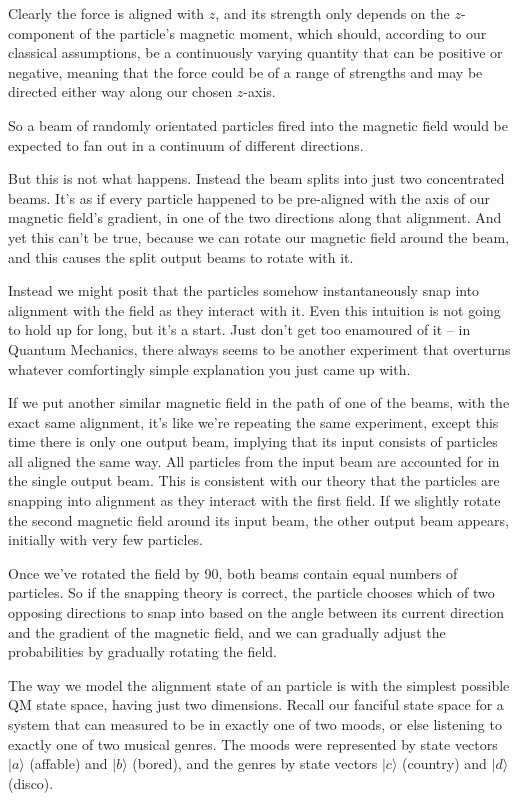 Clearly the force is aligned with $z$, and its strength only depends on the $z$-component of the particle's magnetic moment, which should, according to our classical assumptions, be a continuously varying quantity that can be positive or negative, meaning that the force could be of a range of strengths and may be directed either way along our chosen $z$-axis.

So a beam of randomly orientated particles fired into the magnetic field would be expected to fan out in a continuum of different directions.

But this is not what happens. Instead the beam splits into just two concentrated beams. It's as if every particle happened to be pre-aligned with the axis of our magnetic field's gradient, in one of the two directions along that alignment. And yet this can't be true, because we can rotate our magnetic field around the beam, and this causes the split output beams to rotate with it.

Instead we might posit that the particles somehow instantaneously snap into alignment with the field as they interact with it. Even this intuition is not going to hold up for long, but it's a start. Just don't get too enamoured of it -- in Quantum Mechanics, there always seems to be another experiment that overturns whatever comfortingly simple explanation you just came up with.

If we put another similar magnetic field in the path of one of the beams, with the exact same alignment, it's like we're repeating the same experiment, except this time there is only one output beam, implying that its input consists of particles all aligned the same way. All particles from the input beam are accounted for in the single output beam. This is consistent with our theory that the particles are snapping into alignment as they interact with the first field. If we slightly rotate the second magnetic field around its input beam, the other output beam appears, initially with very few particles.

Once we've rotated the field by 90\textdegree, both beams contain equal numbers of particles. So if the snapping theory is correct, the particle chooses which of two opposing directions to snap into based on the angle between its current direction and the gradient of the magnetic field, and we can gradually adjust the probabilities by gradually rotating the field.

The way we model the alignment state of an particle is with the simplest possible QM state space, having just two dimensions. Recall our fanciful state space for a system that can measured to be in exactly one of two moods, or else listening to exactly one of two musical genres. The moods were represented by state vectors $|a\rangle$ (affable) and $|b\rangle$ (bored), and the genres by state vectors $|c\rangle$ (country) and $|d\rangle$ (disco). 

